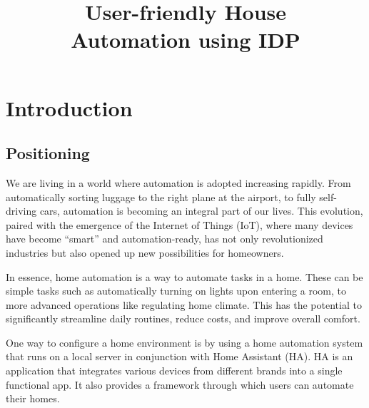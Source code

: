 \documentclass[11pt,a4paper]{report}
\title{User-friendly House\\ Automation using IDP}
\subtitle{}
\begin{document}
\preface%

\printnoidxglossary[type=\acronymtype]%
\clearpage

%
%
%





\chapter{Introduction}
\section{Positioning}
We are living in a world where automation is adopted increasing rapidly. From automatically sorting luggage to the right plane at the airport, to fully self-driving cars, automation is becoming an integral part of our lives. This evolution, paired with the emergence of the Internet of Things (IoT), where many devices have become ``smart'' and automation-ready, has not only revolutionized industries but also opened up new possibilities for homeowners.

In essence, home automation is a way to automate tasks in a home. These can be simple tasks such as automatically turning on lights upon entering a room, to more advanced operations like regulating home climate. This has the potential to significantly streamline daily routines, reduce costs, and improve overall comfort.

One way to configure a home environment is by using a home automation system that runs on a local server in conjunction with Home Assistant (HA). HA is an application that integrates various devices from different brands into a single functional app. It also provides a framework through which users can automate their homes.
\end{document}
